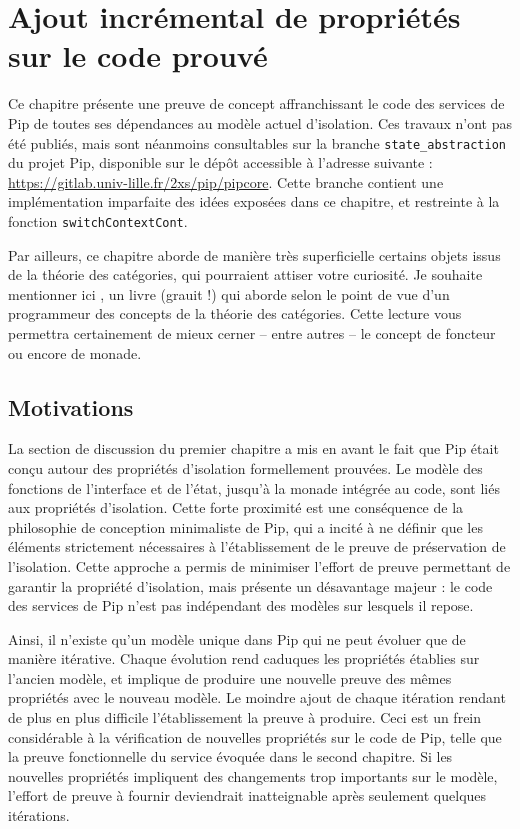 \chapter{Ajout incrémental de propriétés sur le code prouvé}

	Ce chapitre présente une preuve de concept affranchissant le code des services de Pip de toutes ses dépendances au modèle actuel d'isolation. Ces travaux n'ont pas été publiés, mais sont néanmoins consultables sur la branche \texttt{state\_abstraction} du projet Pip, disponible sur le dépôt accessible à l'adresse suivante : \url{https://gitlab.univ-lille.fr/2xs/pip/pipcore}. Cette branche contient une implémentation imparfaite des idées exposées dans ce chapitre, et restreinte à la fonction \texttt{switchContextCont}.

	Par ailleurs, ce chapitre aborde de manière très superficielle certains objets issus de la théorie des catégories, qui pourraient attiser votre curiosité. Je souhaite mentionner ici \cite{categorytheoryforprogrammers}, un livre (grauit !) qui aborde selon le point de vue d'un programmeur des concepts de la théorie des catégories. Cette lecture vous permettra certainement de mieux cerner -- entre autres -- le concept de foncteur ou encore de monade.

	\section{Motivations}

	La section de discussion du premier chapitre a mis en avant le fait que Pip était conçu autour des propriétés d'isolation formellement prouvées. Le modèle des fonctions de l'interface et de l'état, jusqu'à la monade intégrée au code, sont liés aux propriétés d'isolation. Cette forte proximité est une conséquence de la philosophie de conception minimaliste de Pip, qui a incité à ne définir que les éléments strictement nécessaires à l'établissement de le preuve de préservation de l'isolation. Cette approche a permis de minimiser l'effort de preuve permettant de garantir la propriété d'isolation, mais présente un désavantage majeur : le code des services de Pip n'est pas indépendant des modèles sur lesquels il repose.

	Ainsi, il n'existe qu'un modèle unique dans Pip qui ne peut évoluer que de manière itérative. Chaque évolution rend caduques les propriétés établies sur l'ancien modèle, et implique de produire une nouvelle preuve des mêmes propriétés avec le nouveau modèle. Le moindre ajout de chaque itération rendant de plus en plus difficile l'établissement la preuve à produire.
	Ceci est un frein considérable à la vérification de nouvelles propriétés sur le code de Pip, telle que la preuve fonctionnelle du service évoquée dans le second chapitre. Si les nouvelles propriétés impliquent des changements trop importants sur le modèle, l'effort de preuve à fournir deviendrait inatteignable après seulement quelques itérations.

